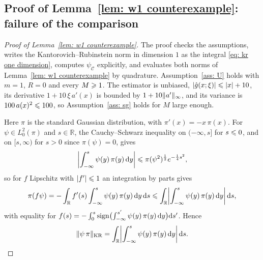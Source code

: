 \subsection{Proof of Lemma~\ref{lem: w1 counterexample}: failure of the comparison}
\label{sec: w1 counterexample proof}

\begin{proof}[Proof of Lemma~\ref{lem: w1 counterexample}]
    The proof checks the assumptions, writes the Kantorovich--Rubinstein norm in dimension $1$ as the integral \eqref{eq: kr one dimension}, computes $\psi_{\mathcal C}$ explicitly, and evaluates both norms of Lemma~\ref{lem: w1 counterexample} by quadrature. Assumption~\ref{ass: U} holds with $m = 1$, $R = 0$ and every $M \geqslant 1$. The estimator is unbiased, $|\hat g(x;\xi)| \leqslant |x| + 10$, its derivative $1 + 10\, \xi\, a'(x)$ is bounded by $1 + 10 \lVert a' \rVert_\infty$, and its variance is $100\, a(x)^2 \leqslant 100$, so Assumption~\ref{ass: sg} holds for $M$ large enough.

    Here $\pi$ is the standard Gaussian distribution, with $\pi'(x) = -x\, \pi(x)$. For $\psi \in L^2_0(\pi)$ and $s \in \mathbb R$, the Cauchy--Schwarz inequality on $(-\infty, s]$ for $s \leqslant 0$, and on $[s, \infty)$ for $s > 0$ since $\pi(\psi) = 0$, gives
    \begin{equation*}
        \biggl| \int_{-\infty}^s \psi(y)\, \pi(y)\, \mathrm{d} y \biggr| \leqslant \pi(\psi^2)^{\frac12} e^{-\frac14 s^2} ,
    \end{equation*}
    so for $f$ Lipschitz with $|f'| \leqslant 1$ an integration by parts gives
    \begin{equation*}
        \pi(f \psi) = -\int_{\mathbb R} f'(s) \int_{-\infty}^s \psi(y)\, \pi(y)\, \mathrm{d} y \,\mathrm{d} s \leqslant \int_{\mathbb R} \biggl| \int_{-\infty}^s \psi(y)\, \pi(y)\, \mathrm{d} y \biggr| \,\mathrm{d} s ,
    \end{equation*}
    with equality for $f(s) = -\int_0^s \mathrm{sign}\bigl( \int_{-\infty}^{s'} \psi(y)\, \pi(y)\, \mathrm{d} y \bigr) \mathrm{d} s'$. Hence
    \begin{equation}
        \lVert \psi\, \pi \rVert_{\mathrm{KR}} = \int_{\mathbb R} \biggl| \int_{-\infty}^s \psi(y)\, \pi(y)\, \mathrm{d} y \biggr| \,\mathrm{d} s .
        \label{eq: kr one dimension}
    \end{equation}


\end{proof}
